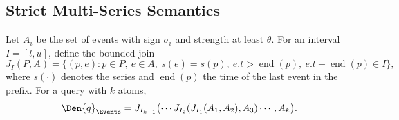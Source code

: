 \subsection{Strict Multi-Series Semantics}

Let $A_i$ be the set of events with sign $\sigma_i$ and strength at least $\theta$. For an interval $I=[l,u]$, define the bounded join
\begin{equation}
J_I(P,A)=\{(p,e):p\in P,\ e\in A,\ s(e)=s(p),\ e.t>\operatorname{end}(p),\ e.t-\operatorname{end}(p)\in I\},
\end{equation}
where $s(\cdot)$ denotes the series and $\operatorname{end}(p)$ the time of the last event in the prefix. For a query with $k$ atoms,
\begin{equation}
\Den{q}_{\Events}=J_{I_{k-1}}\bigl(\cdots J_{I_2}(J_{I_1}(A_1,A_2),A_3)\cdots,A_k\bigr).
\end{equation}
